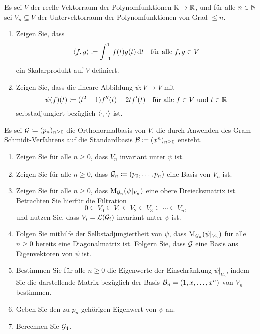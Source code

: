 \documentclass[a4paper,10pt]{scrartcl}
\begin{document}
\begin{question}
  Es sei $V$ der reelle Vektorraum der Polynomfunktionen $\mathbb{R} \to \mathbb{R}$, und für alle $n \in \mathbb{N}$ sei $V_n \subseteq V$ der Untervektorraum der Polynomfunktionen von Grad $\leq n$.
  \begin{enumerate}[leftmargin=*]
    \item
      Zeigen Sie, dass
      \[
                  \langle f, g \rangle
        \coloneqq \int_{-1}^1 f(t) g(t) \,\text{d}t
        \quad
        \text{für alle $f, g \in V$}
      \]
      ein Skalarprodukt auf $V$ definiert.
    \item
      Zeigen Sie, dass die lineare Abbildung $\psi \colon V \to V$ mit
      \[
        \psi(f)(t) \coloneqq (t^2 - 1) f''(t) + 2t f'(t)
        \quad
        \text{für alle $f \in V$ und $t \in \mathbb{R}$}
      \]
      selbstadjungiert bezüglich $\langle \cdot, \cdot \rangle$ ist.
  \end{enumerate}
  Es sei $\mathcal{G} \coloneqq (p_n)_{n \geq 0}$ die Orthonormalbasis von $V$, die durch Anwenden des Gram-Schmidt-Verfahrens auf die Standardbasis $\mathcal{B} \coloneqq (x^n)_{n \geq 0}$ ensteht.
  \begin{enumerate}[resume, leftmargin=*]
    \item
      Zeigen Sie für alle $n \geq 0$, dass $V_n$ invariant unter $\psi$ ist.
    \item
      Zeigen Sie für alle $n \geq 0$, dass $\mathcal{G}_n \coloneqq (p_0, \dotsc, p_n)$ eine Basis von $V_n$ ist.
    \item
      Zeigen Sie für alle $n \geq 0$, dass $\operatorname{M}_{\mathcal{G}_n}(\psi|_{V_n})$ eine obere Dreiecksmatrix ist.
      Betrachten Sie hierfür die Filtration
      \[
        0 \subseteq V_0 \subseteq V_1 \subseteq V_2 \subseteq V_3 \subseteq \dotsb \subseteq V_n,
      \]
      und nutzen Sie, dass $V_i = \operatorname{\mathcal{L}}(\mathcal{G}_i)$ invariant unter $\psi$ ist.
    \item
      Folgen Sie mithilfe der Selbstadjungiertheit von $\psi$, dass $\operatorname{M}_{\mathcal{G}_n}(\psi|_{V_n})$ für alle $n \geq 0$ bereits eine Diagonalmatrix ist.
      Folgern Sie, dass $\mathcal{G}$ eine Basis aus Eigenvektoren von $\psi$ ist.
    \item
      Bestimmen Sie für alle $n \geq 0$ die Eigenwerte der Einschränkung $\psi|_{V_n}$, indem Sie die darstellende Matrix bezüglich der Basis $\mathcal{B}_n = (1, x, \dotsc, x^n)$ von $V_n$ bestimmen.
    \item
      Geben Sie den zu $p_n$ gehörigen Eigenwert von $\psi$ an.
    \item
      Berechnen Sie $\mathcal{G}_4$.
  \end{enumerate}
\end{question}
\end{document}
